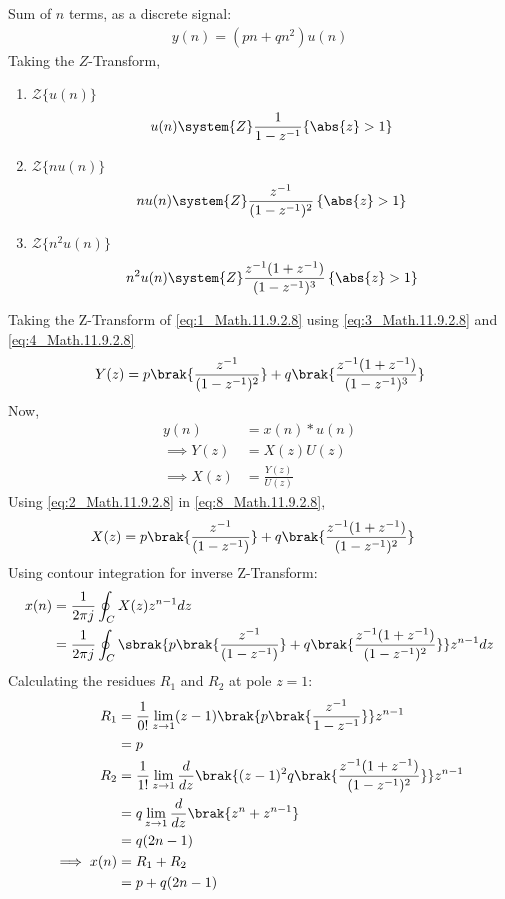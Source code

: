 \documentclass[journal,12pt,twocolumn]{IEEEtran}
\theoremstyle{remark}
\begin{document}
Sum of $n$ terms, as a discrete signal:
\begin{align}
    y(n) = (pn + qn^2)u(n) \label{eq:1_Math.11.9.2.8}
\end{align}
Taking the $Z$-Transform,
\begin{enumerate}
    \item $\mathcal{Z}\{u(n)\}$
\begin{align}
    u(n) \system{Z} \frac{1}{1-z^{-1}} \{\abs{z} > 1\} \label{eq:2_Math.11.9.2.8}
\end{align}
    \item $\mathcal{Z}\{nu(n)\}$
\begin{align}
    nu(n) \system{Z} \frac{z^{-1}}{(1-z^{-1})^2}\, \{\abs{z} > 1\} \label{eq:3_Math.11.9.2.8}
\end{align}
\item $\mathcal{Z}{\{n^2 u(n)\}}$
    \begin{align}
        n^2u(n) \system{Z} \frac{z^{-1}(1+z^{-1})}{(1-z^{-1})^3}\, \{\abs{z} > 1\} \label{eq:4_Math.11.9.2.8}
    \end{align}
\end{enumerate}
Taking the Z-Transform of \eqref{eq:1_Math.11.9.2.8} using \eqref{eq:3_Math.11.9.2.8} and \eqref{eq:4_Math.11.9.2.8}
\begin{align}
      Y(z) = p\brak{\frac{z^{-1}}{(1-z^{-1})^2}} + q\brak{\frac{z^{-1}(1 + z^{-1})}{(1-z^{-1})^3}}
\end{align}
Now, 
\begin{align}
    y(n) &= x(n) \ast u(n)\\
    \implies Y(z) &= X(z)U(z)\\
    \implies X(z) &= \frac{Y(z)}{U(z)}\label{eq:8_Math.11.9.2.8}
\end{align}
Using \eqref{eq:2_Math.11.9.2.8} in \eqref{eq:8_Math.11.9.2.8},
\begin{align}
    X(z) &= p\brak{\frac{z^{-1}}{(1-z^{-1})}} + q\brak{\frac{z^{-1}(1 + z^{-1})}{(1-z^{-1})^2}}
\end{align}
Using contour integration for inverse Z-Transform:
\begin{align}
    x(n) &= \frac{1}{2\pi j} \oint_C X(z) z^{n-1}dz\\
    &= \frac{1}{2 \pi j} \oint_C  \sbrak{p\brak{\frac{z^{-1}}{(1-z^{-1})}} + q\brak{\frac{z^{-1}(1 + z^{-1})}{(1-z^{-1})^2}}}z^{n-1}dz
\end{align}
Calculating the residues $R_1$ and $R_2$ at pole $z=1$:
\begin{align}
    R_1 &= \frac{1}{0!} \lim_{z \to 1}(z-1)\brak{p\brak{\frac{z^{-1}}{1-z^{-1}}}}z^{n-1}\\
    &= p\\
    R_2 &= \frac{1}{1!} \lim_{z \to 1}\frac{d}{dz}\brak{(z-1)^2q\brak{\frac{z^{-1}(1 + z^{-1})}{(1-z^{-1})^2}}}z^{n-1}\\
    &= q\lim_{z \to 1}\frac{d}{dz}\brak{z^{n} + z^{n-1}}\\
    &= q(2n-1)\\
    \implies x(n) &= R_1 + R_2\\
    &= p + q(2n-1)
\end{align}
\end{document}
